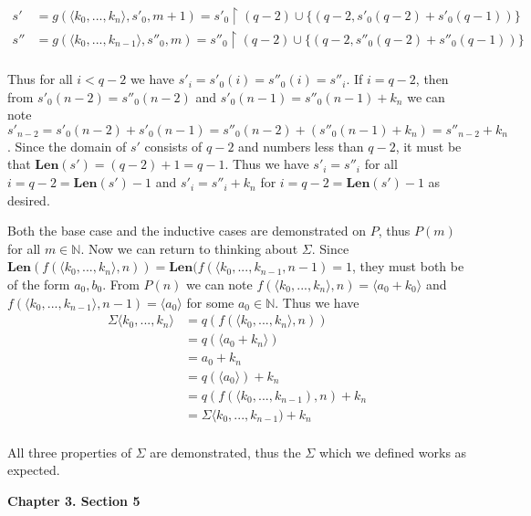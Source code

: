 \documentclass{article}
\newcommand{ \len }[0]{ \textbf{Len} }
\begin{document}
\begin{enumerate}
			
			\begin{align*}	
				s' &= g(\langle k_0, ..., k_n \rangle, s'_{0}, m + 1) = s'_{0} \upharpoonright (q - 2) \cup \{(q - 2, s'_{0}(q - 2) + s'_{0}(q - 1))\}\\
				s'' &= g(\langle k_0, ..., k_{n - 1} \rangle, s''_{0}, m) = s''_{0} \upharpoonright (q - 2) \cup \{(q - 2, s''_{0}(q - 2) + s''_{0}(q - 1))\}\\
			\end{align*}
			
			Thus for all $i < q - 2$ we have $s'_{i} = s'_{0}(i) = s''_{0}(i) = s''_{i}$. If $i = q - 2$, then from $s'_{0}(n - 2) = s''_{0}(n - 2)$ and $s'_{0}(n - 1) = s''_{0}(n - 1) + k_n$ we can note $s'_{n - 2} = s'_{0}(n - 2) + s'_{0}(n - 1) = s''_{0}(n - 2) + (s''_{0}(n - 1) + k_n) = s''_{n - 2} + k_n$. Since the domain of $s'$ consists of $q - 2$ and numbers less than $q - 2$, it must be that $\len(s') = (q - 2) + 1 = q - 1$. Thus we have $s'_{i} = s''_{i}$ for all $i = q - 2 = \len(s') - 1$ and $s'_{i} = s''_{i} + k_n$ for $i = q - 2 = \len(s') - 1$ as desired.
			
			\medskip
			Both the base case and the inductive cases are demonstrated on $P$, thus $P(m)$ for all $m \in \mathbb{N}$.
			Now we can return to thinking about $\Sigma$. Since $\len(f(\langle k_0, ..., k_n \rangle, n)) = \len(f(\langle k_0, ..., k_{n - 1}, n - 1) = 1$, they must both be of the form $a_0, b_0$. From $P(n)$ we can note $f(\langle k_0, ..., k_n \rangle, n) = \langle a_0 + k_0 \rangle$ and $f(\langle k_0, ..., k_{n - 1} \rangle, n - 1) = \langle a_0 \rangle$ for some $a_0 \in \mathbb{N}$. Thus we have 
			\begin{align*}
				\Sigma \langle k_0, ..., k_n \rangle &= q(f(\langle k_0, ..., k_n \rangle, n))\\
				&= q(\langle a_0 + k_n \rangle)\\
				&= a_0 + k_n\\
				&= q(\langle a_0 \rangle) + k_n\\
				&= q(f(\langle k_0, ..., k_{n - 1}), n) + k_n\\
				&= \Sigma \langle k_0, ..., k_{n - 1}) + k_n\\
			\end{align*}
			
			All three properties of $\Sigma$ are demonstrated, thus the $\Sigma$ which we defined works as expected.
			\end{enumerate}
			
			\medskip
			 \textbf{Chapter 3. Section 5}
			 \medskip
			 
\end{document}

